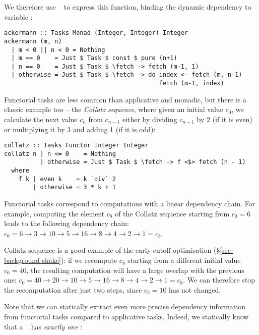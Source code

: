 We therefore use ~ to express this function, binding the
dynamic dependency to variable :

\vspace{1mm}
\begin{verbatim}
ackermann :: Tasks Monad (Integer, Integer) Integer
ackermann (m, n)
  | m < 0 || n < 0 = Nothing
  | m == 0    = Just $ Task $ const $ pure (n+1)
  | n == 0    = Just $ Task $ \fetch -> fetch (m-1, 1)
  | otherwise = Just $ Task $ \fetch -> do index <- fetch (m, n-1)
                                           fetch (m-1, index)
\end{verbatim}
\vspace{1mm}

\noindent
Functorial tasks are less common than applicative and monadic, but there is a
classic example too -- the \emph{Collatz sequence}, where given an initial value
$c_0$, we calculate the next value $c_n$ from $c_{n-1}$ either by dividing
$c_{n-1}$ by 2 (if it is even) or multiplying it by 3 and adding 1 (if it is
odd):

\vspace{1mm}
\begin{verbatim}
collatz :: Tasks Functor Integer Integer
collatz n | n <= 0    = Nothing
          | otherwise = Just $ Task $ \fetch -> f <$> fetch (n - 1)
  where
    f k | even k    = k `div` 2
        | otherwise = 3 * k + 1
\end{verbatim}
\vspace{1mm}

\noindent
Functorial tasks correspond to computations with a linear dependency chain. For
example, computing the element $c_8$ of the Collatz sequence starting from
$c_0=6$ leads to the following dependency chain:
$c_0 = 6 \rightarrow 3 \rightarrow 10 \rightarrow 5 \rightarrow 16 \rightarrow 8
\rightarrow 4 \rightarrow 2 \rightarrow 1 = c_8$.

Collatz sequence is a good example of the early cutoff optimisation
(\S\ref{sec-background-shake}): if we recompute $c_8$ starting from a different
initial value $c_0=40$, the resulting computation will have a large overlap with
the previous one:
$c_0 = 40 \rightarrow 20 \rightarrow 10 \rightarrow 5 \rightarrow 16 \rightarrow
8 \rightarrow 4 \rightarrow 2 \rightarrow 1 = c_8$. We can therefore stop the
recomputation after just two steps, since $c_2=10$ has not changed.

Note that we can statically extract even more precise dependency information
from functorial tasks compared to applicative tasks. Indeed, we statically know
that a ~ has \emph{exactly one} :

